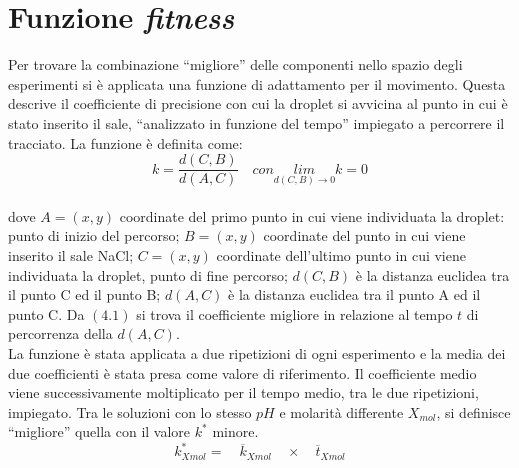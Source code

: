 \section{Funzione \emph{fitness}}
Per trovare la combinazione ``migliore''  delle componenti nello spazio degli esperimenti si è applicata una funzione di adattamento per il movimento. Questa descrive il coefficiente di precisione con cui la droplet si avvicina al punto in cui è stato inserito il sale, ``analizzato in funzione del tempo'' impiegato a percorrere il tracciato. La funzione è definita come:
\begin{equation} 	
	k = \frac { d(C,B) }{ d(A,C) }  \quad con \underset { d(C,B)\rightarrow 0 }{ lim } k=0
\end{equation}
\\dove
$A=(x,y)$ coordinate del primo punto in cui viene individuata la droplet: punto di inizio del percorso;
$B=(x,y)$ coordinate del punto in cui viene inserito il sale NaCl;
$C=(x,y)$ coordinate dell'ultimo punto in cui viene individuata la droplet, punto di fine percorso;
$d(C,B)$ è la distanza euclidea tra il punto C ed il punto B; $d(A,C)$ è la distanza euclidea tra il punto A ed il punto C.
Da $(4.1)$ si trova il coefficiente migliore in relazione al tempo $t$ di percorrenza della $d(A,C)$. 
\\La funzione è stata applicata a due ripetizioni di ogni esperimento e la media dei due coefficienti è stata presa come valore di riferimento. Il coefficiente medio viene successivamente moltiplicato per il tempo medio, tra le due ripetizioni, impiegato. Tra le soluzioni con lo stesso $pH$ e molarità differente $X_{mol}$, si definisce ``migliore'' quella con il valore $k^*$ minore. 
\begin{equation} 	
	{ { k }_{ Xmol }^{ * } }=\quad { \overline { k }  }_{ Xmol }\quad \times \quad \overline { t } _{ Xmol }
\end{equation}

